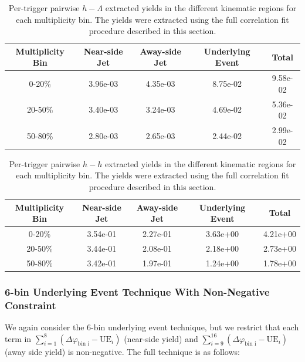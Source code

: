 \documentclass[ALICE,manyauthors]{ALICE_analysis_notes}
\begin{document}
\begin{table}[h!]
\centering
\begin{tabular}{| c | c | c | c | c | }
\hline
Multiplicity Bin & Near-side Jet & Away-side Jet & Underlying Event & Total  \\
\hline
	
0-20\% & 3.96e-03 & 4.35e-03 & 8.75e-02 & 9.58e-02 \\
20-50\% & 3.40e-03 & 3.24e-03 & 4.69e-02 & 5.36e-02 \\
50-80\% & 2.80e-03 & 2.65e-03 & 2.44e-02 & 2.99e-02 \\
	
\hline
\end{tabular}
\caption{Per-trigger pairwise $h-\Lambda$ extracted yields in the different kinematic regions for each multiplicity bin. The yields were extracted using the full correlation fit procedure described in this section.}
\label{h_lambda_yield_table_fullfit}
\end{table}
	
\begin{table}[h!]
\centering
\begin{tabular}{| c | c | c | c | c | }
\hline
Multiplicity Bin & Near-side Jet & Away-side Jet & Underlying Event & Total  \\
\hline

0-20\% & 3.54e-01 & 2.27e-01 & 3.63e+00 & 4.21e+00  \\
20-50\% & 3.44e-01 & 2.08e-01 & 2.18e+00 & 2.73e+00 \\
50-80\% & 3.42e-01 & 1.97e-01 & 1.24e+00 & 1.78e+00 \\

\hline
\end{tabular}
\caption{Per-trigger pairwise $h-h$ extracted yields in the different kinematic regions for each multiplicity bin. The yields were extracted using the full correlation fit procedure described in this section.}
\label{h_h_yield_table_fullfit}
\end{table}

\subsubsection{6-bin Underlying Event Technique With Non-Negative Constraint}
\label{6binnonneg}
We again consider the 6-bin underlying event technique, but we restrict that each term in $\sum_{i=1}^{8} (\Delta\varphi_\text{bin i} - \text{UE}_i)$ (near-side yield) and $\sum_{i=9}^{16} (\Delta\varphi_\text{bin i} - \text{UE}_i)$ (away side yield) is non-negative. The full technique is as follows:
\end{document}
